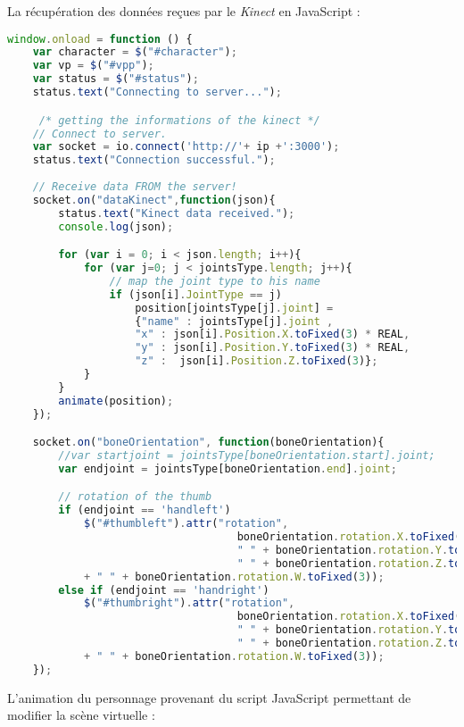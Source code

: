 La récupération des données reçues par le \textit{Kinect} en \textsf{JavaScript} :

\lstset{style=mystyle}
\begin{lstlisting}[language=JavaScript]
window.onload = function () {
	var character = $("#character");
	var vp = $("#vpp");
	var status = $("#status");
    status.text("Connecting to server...");

	 /* getting the informations of the kinect */
    // Connect to server.
    var socket = io.connect('http://'+ ip +':3000');
    status.text("Connection successful.");
   
    // Receive data FROM the server!
    socket.on("dataKinect",function(json){
        status.text("Kinect data received.");
        console.log(json);

        for (var i = 0; i < json.length; i++){
        	for (var j=0; j < jointsType.length; j++){
        		// map the joint type to his name
        		if (json[i].JointType == j)
            		position[jointsType[j].joint] =  
            		{"name" : jointsType[j].joint , 
            		"x" : json[i].Position.X.toFixed(3) * REAL, 
            		"y" : json[i].Position.Y.toFixed(3) * REAL, 
            		"z" :  json[i].Position.Z.toFixed(3)};
        	}
        }
		animate(position);
    });

 	socket.on("boneOrientation", function(boneOrientation){
 		//var startjoint = jointsType[boneOrientation.start].joint;
 		var endjoint = jointsType[boneOrientation.end].joint;

 		// rotation of the thumb 
 		if (endjoint == 'handleft')
 			$("#thumbleft").attr("rotation", 
 									boneOrientation.rotation.X.toFixed(3) + 
 									" " + boneOrientation.rotation.Y.toFixed(3) + 
 									" " + boneOrientation.rotation.Z.toFixed(3) 
 			+ " " + boneOrientation.rotation.W.toFixed(3));
 		else if (endjoint == 'handright')
 			$("#thumbright").attr("rotation", 
 									boneOrientation.rotation.X.toFixed(3) + 
 									" " + boneOrientation.rotation.Y.toFixed(3) + 
 									" " + boneOrientation.rotation.Z.toFixed(3) 
 			+ " " + boneOrientation.rotation.W.toFixed(3));
 	});
\end{lstlisting}

L'animation du personnage provenant du script \textsf{JavaScript} permettant de modifier la scène virtuelle :

